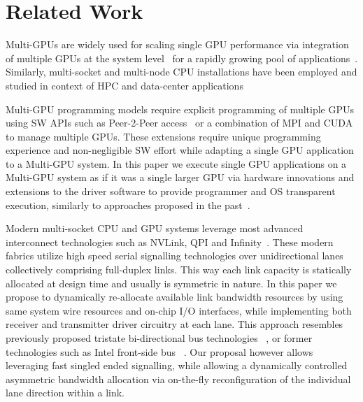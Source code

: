 \section{Related Work}
Multi-GPUs are widely used for scaling single GPU performance via integration 
of multiple GPUs at the system 
level~\cite{pascal-tesla-wp,dgx,intersect360,titan_supercomputer} for a 
rapidly growing pool of 
applications~\cite{coral,cudnn,Lavin15b,SimonyanZ14a}. Similarly, 
multi-socket and multi-node CPU installations have been employed and studied 
in context of HPC and data-center 
applications~\cite{Intel:Xeon,IBM:Power,IBM:z196,AMD:Opteron}

Multi-GPU programming models require explicit programming of multiple GPUs
using SW APIs such as Peer-2-Peer access~\cite{NVIDIAP2P} or a combination of
MPI and CUDA~\cite{NVIDIAMPI} to manage multiple GPUs. These extensions require
unique programming experience and non-negligible SW effort while adapting a
single GPU application to a Multi-GPU system. In this paper
we execute single GPU applications on a Multi-GPU system as if it was a single
larger GPU via hardware innovations and extensions to the driver software to
provide programmer and OS transparent execution, similarly to approaches
proposed in the past~\cite{Cabezas2015,lee2013transparent,ben2015memory}.

Modern multi-socket CPU and GPU systems leverage most advanced interconnect
technologies such as NVLink, QPI and
Infinity~\cite{dgx,INTELQPI,AMDINFINITYFABRIC}. These modern fabrics utilize
high speed serial signalling technologies over unidirectional lanes
collectively comprising full-duplex links. This way each link capacity is
statically allocated at design time and usually is symmetric in nature. In this
paper we propose to dynamically re-allocate available link bandwidth resources
by using same system wire resources and on-chip I/O interfaces, while
implementing both receiver and transmitter driver circuitry at each lane. This
approach resembles previously proposed tristate bi-directional bus
technologies ~\cite{tri-state}, or former technologies such as Intel front-side
bus ~\cite{fsb}. Our proposal however allows leveraging fast
singled ended signalling, while allowing a dynamically controlled
asymmetric bandwidth allocation via on-the-fly reconfiguration of the
individual lane direction within a link.

